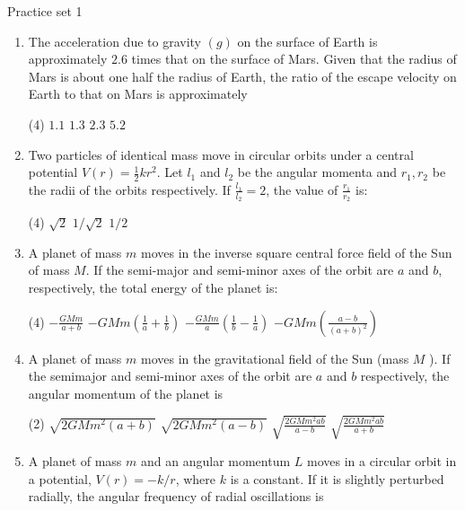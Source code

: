  
 \newpage
 \begin{abox}
 	Practice set 1
 	\end{abox}
 \begin{enumerate}
 	\item The acceleration due to gravity $(g)$ on the surface of Earth is approximately $2.6$ times that on the surface of Mars. Given that the radius of Mars is about one half the radius of Earth, the ratio of the escape velocity on Earth to that on Mars is approximately
 	{}
 \begin{tasks}(4)
 	\task[\textbf{A.}] $1.1$
 	\task[\textbf{B.}]$1.3$
 	\task[\textbf{C.}]$2.3$
 	\task[\textbf{D.}]$5.2$
 \end{tasks}
	\item Two particles of identical mass move in circular orbits under a central potential $V(r)=\frac{1}{2} k r^{2}$. Let $l_{1}$ and $l_{2}$ be the angular momenta and $r_{1}, r_{2}$ be the radii of the orbits respectively. If $\frac{l_{1}}{l_{2}}=2$, the value of $\frac{r_{1}}{r_{2}}$ is:
	{}
\begin{tasks}(4)
	\task[\textbf{A.}] $\sqrt{2}$
	\task[\textbf{B.}]$1 / \sqrt{2}$
	\task[\textbf{D.}] $1 / 2$
\end{tasks}
	\item A planet of mass $m$ moves in the inverse square central force field of the Sun of mass $M$. If the semi-major and semi-minor axes of the orbit are $a$ and $b$, respectively, the total energy of the planet is:
	{}
\begin{tasks}(4)
	\task[\textbf{A.}] $-\frac{G M m}{a+b}$
	\task[\textbf{B.}]$-G M m\left(\frac{1}{a}+\frac{1}{b}\right)$
	\task[\textbf{C.}]$-\frac{G M m}{a}\left(\frac{1}{b}-\frac{1}{a}\right)$
	\task[\textbf{D.}]$-G M m\left(\frac{a-b}{(a+b)^{2}}\right)$
\end{tasks}
	\item A planet of mass $m$ moves in the gravitational field of the Sun (mass $M$ ). If the semimajor and semi-minor axes of the orbit are $a$ and $b$ respectively, the angular momentum of the planet is
	{}
\begin{tasks}(2)
	\task[\textbf{A.}]$\sqrt{2 G M m^{2}(a+b)}$
	\task[\textbf{B.}]$\sqrt{2 G M m^{2}(a-b)}$
	\task[\textbf{C.}]$\sqrt{\frac{2 G M m^{2} a b}{a-b}}$
	\task[\textbf{D.}]$\sqrt{\frac{2 G M m^{2} a b}{a+b}}$
\end{tasks}
	\item A planet of mass $m$ and an angular momentum $L$ moves in a circular orbit in a potential, $V(r)=-k / r$, where $k$ is a constant. If it is slightly perturbed radially, the angular frequency of radial oscillations is

\end{enumerate}
